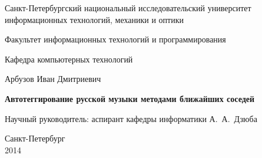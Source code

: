\documentclass[a4paper]{report}
\theoremstyle{plain}
\theoremstyle{definition}
\numberwithin{theorem}{chapter}        %
\begin{document}
 \renewcommand{\thelstlisting}{\thesection.\arabic{lstlisting}}
\initializefrontsections

\pagestyle{title}

\begin{center}
Санкт-Петербургский национальный исследовательский университет \\ информационных технологий, механики и оптики

\vspace{2cm}

Факультет информационных технологий и программирования

Кафедра компьютерных технологий

\vspace{3cm}

{\Large Арбузов Иван Дмитриевич}

\vspace{2cm}

\vbox{\LARGE\bfseries
Автотеггирование русской музыки методами ближайших соседей
}

\vspace{4cm}

{\Large Научный руководитель: аспирант кафедры информатики А.~А.~Дзюба}

\vspace{6cm}

Санкт-Петербург\\ 2014
\end{center}

\newpage

\setcounter{page}{3}
\pagestyle{plain}

\tableofcontents

\startthechapters




% 


\end{document}
